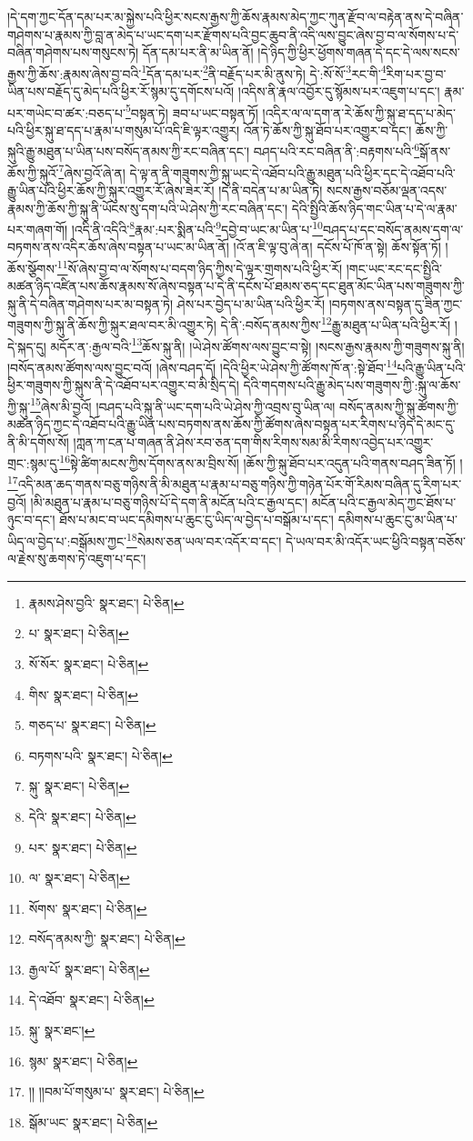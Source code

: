 །དེ་དག་ཀྱང་དོན་དམ་པར་མ་སྐྱེས་པའི་ཕྱིར་སངས་རྒྱས་ཀྱི་ཆོས་རྣམས་མེད་ཀྱང་ཀུན་རྫོབ་ལ་བརྟེན་ནས་དེ་བཞིན་གཤེགས་པ་རྣམས་ཀྱི་བླ་ན་མེད་པ་ཡང་དག་པར་རྫོགས་པའི་བྱང་ཆུབ་ནི་འདི་ལས་བྱུང་ཞེས་བྱ་བ་ལ་སོགས་པ་དེ་བཞིན་གཤེགས་པས་གསུངས་ཏེ། དོན་དམ་པར་ནི་མ་ཡིན་ནོ། །དེ་ཉིད་ཀྱི་ཕྱིར་ཕྱོགས་གཞན་དེ་དང་དེ་ལས་སངས་རྒྱས་ཀྱི་ཆོས་:རྣམས་ཞེས་བྱ་བའི་\footnote{རྣམས་ཤེས་བྱའི་  སྣར་ཐང་།  པེ་ཅིན། }དོན་དམ་པར་\footnote{པ་  སྣར་ཐང་།  པེ་ཅིན། }ནི་བརྗོད་པར་མི་ནུས་ཏེ། དེ་:སོ་སོ་\footnote{སོ་སོར་  སྣར་ཐང་།  པེ་ཅིན། }རང་གི་\footnote{གིས་  སྣར་ཐང་།  པེ་ཅིན། }རིག་པར་བྱ་བ་ཡིན་པས་བརྗོད་དུ་མེད་པའི་ཕྱིར་རོ་སྙམ་དུ་དགོངས་པའོ། །འདིས་ནི་རྣལ་འབྱོར་དུ་སྙོམས་པར་འཇུག་པ་དང་། རྣམ་པར་གཡེང་བ་ཚར་:བཅད་པ་\footnote{གཅད་པ་  སྣར་ཐང་།  པེ་ཅིན། }བསྟན་ཏེ། ཟབ་པ་ཡང་བསྟན་ཏོ། །འདིར་ལ་ལ་དག་ན་རེ་ཆོས་ཀྱི་སྐུ་ཐ་དད་པ་མེད་པའི་ཕྱིར་སྐུ་ཐ་དད་པ་རྣམ་པ་གསུམ་པོ་འདི་ཇི་ལྟར་འགྱུར། འོན་ཏེ་ཆོས་ཀྱི་སྐུ་ཐོབ་པར་འགྱུར་བ་དང་། ཆོས་ཀྱི་སྐུའི་རྒྱུ་མཐུན་པ་ཡིན་པས་བསོད་ནམས་ཀྱི་རང་བཞིན་དང་། བཤད་པའི་རང་བཞིན་ནི་:བརྟགས་པའི་\footnote{བཏགས་པའི་  སྣར་ཐང་།  པེ་ཅིན། }སྒོ་ནས་ཆོས་ཀྱི་སྐུའོ་\footnote{སྐུ་  སྣར་ཐང་།  པེ་ཅིན། }ཞེས་བྱའོ་ཞེ་ན། དེ་ལྟ་ན་ནི་གཟུགས་ཀྱི་སྐུ་ཡང་དེ་འཐོབ་པའི་རྒྱུ་མཐུན་པའི་ཕྱིར་དང་དེ་འཐོབ་པའི་རྒྱུ་ཡིན་པའི་ཕྱིར་ཆོས་ཀྱི་སྐུར་འགྱུར་རོ་ཞེས་ཟེར་རོ། །དེ་ནི་བདེན་པ་མ་ཡིན་ཏེ། སངས་རྒྱས་བཅོམ་ལྡན་འདས་རྣམས་ཀྱི་ཆོས་ཀྱི་སྐུ་ནི་ཡོངས་སུ་དག་པའི་ཡེ་ཤེས་ཀྱི་རང་བཞིན་དང་། དེའི་སྤྱིའི་ཆོས་ཉིད་གང་ཡིན་པ་དེ་ལ་རྣམ་པར་གཞག་གོ། །འདི་ནི་འདིའི་\footnote{དེའི་  སྣར་ཐང་།  པེ་ཅིན། }རྣམ་:པར་སྨིན་པའི་\footnote{པར་  སྣར་ཐང་།  པེ་ཅིན། }དབྱེ་བ་ཡང་མ་ཡིན་པ་\footnote{ལ་  སྣར་ཐང་།  པེ་ཅིན། }བཤད་པ་དང་བསོད་ནམས་དག་ལ་བཏགས་ནས་འདིར་ཆོས་ཞེས་བསྟན་པ་ཡང་མ་ཡིན་ནོ། །འོ་ན་ཇི་ལྟ་བུ་ཞེ་ན། དངོས་པོ་ཁོ་ན་སྟེ། ཆོས་སྟོན་ཏོ། །ཆོས་སྩོགས་\footnote{སོགས་  སྣར་ཐང་།  པེ་ཅིན། }སོ་ཞེས་བྱ་བ་ལ་སོགས་པ་བདག་ཉིད་ཀྱིས་དེ་ལྟར་གྲགས་པའི་ཕྱིར་རོ། །གང་ཡང་རང་དང་སྤྱིའི་མཚན་ཉིད་འཛིན་པས་ཆོས་རྣམས་སོ་ཞེས་བསྟན་པ་དེ་ནི་དངོས་པོ་ཐམས་ཅད་དང་ཐུན་མོང་ཡིན་པས་གཟུགས་ཀྱི་སྐུ་ནི་དེ་བཞིན་གཤེགས་པར་མ་བསྟན་ཏེ། ཤེས་པར་བྱེད་པ་མ་ཡིན་པའི་ཕྱིར་རོ། །བཏགས་ནས་བསྟན་དུ་ཟིན་ཀྱང་གཟུགས་ཀྱི་སྐུ་ནི་ཆོས་ཀྱི་སྐུར་ཐལ་བར་མི་འགྱུར་ཏེ། དེ་ནི་:བསོད་ནམས་ཀྱིས་\footnote{བསོད་ནམས་ཀྱི་  སྣར་ཐང་།  པེ་ཅིན། }རྒྱུ་མཐུན་པ་ཡིན་པའི་ཕྱིར་རོ། །དེ་སྐད་དུ། མདོར་ན་:རྒྱལ་བའི་\footnote{རྒྱལ་པོ་  སྣར་ཐང་།  པེ་ཅིན། }ཆོས་སྐུ་ནི། །ཡེ་ཤེས་ཚོགས་ལས་བྱུང་བ་སྟེ། །སངས་རྒྱས་རྣམས་ཀྱི་གཟུགས་སྐུ་ནི། །བསོད་ནམས་ཚོགས་ལས་བྱུང་བའོ། །ཞེས་བཤད་དོ། །དེའི་ཕྱིར་ཡེ་ཤེས་ཀྱི་ཚོགས་ཁོ་ན་:སྟེ་ཐོབ་\footnote{དེ་འཐོབ་  སྣར་ཐང་།  པེ་ཅིན། }པའི་རྒྱུ་ཡིན་པའི་ཕྱིར་གཟུགས་ཀྱི་སྐུས་ནི་དེ་འཐོབ་པར་འགྱུར་བ་མི་སྲིད་དེ། དེའི་གདགས་པའི་རྒྱུ་མེད་པས་གཟུགས་ཀྱི་:སྐུ་ལ་ཆོས་ཀྱི་སྐུ་\footnote{སྐུ་  སྣར་ཐང་། }ཞེས་མི་བྱའོ། །བཤད་པའི་སྐུ་ནི་ཡང་དག་པའི་ཡེ་ཤེས་ཀྱི་འབྲས་བུ་ཡིན་ལ། བསོད་ནམས་ཀྱི་སྐུ་ཚོགས་ཀྱི་མཚན་ཉིད་ཀྱང་དེ་འཐོབ་པའི་རྒྱུ་ཡིན་པས་བཏགས་ནས་ཆོས་ཀྱི་ཚོགས་ཞེས་བསྟན་པར་རིགས་པ་ཉིད་དེ་མང་དུ་ནི་མི་དགོས་སོ། །ཀླན་ཀ་ངན་པ་གཞན་ནི་ཤེས་རབ་ཅན་དག་གིས་རིགས་སམ་མི་རིགས་འབྱེད་པར་འགྱུར་གྲང་:སྙམ་དུ་\footnote{སྙམ་  སྣར་ཐང་།  པེ་ཅིན། }སྟེ་ཚིག་མངས་ཀྱིས་དོགས་ནས་མ་བྲིས་སོ། །ཆོས་ཀྱི་སྐུ་ཐོབ་པར་འདུན་པའི་གནས་བཤད་ཟིན་ཏོ། །\footnote{།། །།བམ་པོ་གསུམ་པ་  སྣར་ཐང་།  པེ་ཅིན། }འདི་མན་ཆད་གནས་བཅུ་གཉིས་ནི་མི་མཐུན་པ་རྣམ་པ་བཅུ་གཉིས་ཀྱི་གཉེན་པོར་གོ་རིམས་བཞིན་དུ་རིག་པར་བྱའོ། །མི་མཐུན་པ་རྣམ་པ་བཅུ་གཉིས་པོ་དེ་དག་ནི་མངོན་པའི་ང་རྒྱལ་དང་། མངོན་པའི་ང་རྒྱལ་མེད་ཀྱང་ཐོས་པ་ཉུང་བ་དང་། ཐོས་པ་མང་བ་ཡང་དམིགས་པ་ཆུང་ངུ་ཡིད་ལ་བྱེད་པ་བསྒོམ་པ་དང་། དམིགས་པ་ཆུང་ངུ་མ་ཡིན་པ་ཡིད་ལ་བྱེད་པ་:བསྒོམས་ཀྱང་\footnote{སྒོམ་ཡང་  སྣར་ཐང་།  པེ་ཅིན། }སེམས་ཅན་ཡལ་བར་འདོར་བ་དང་། དེ་ཡལ་བར་མི་འདོར་ཡང་ཕྱིའི་བསྟན་བཅོས་ལ་རྗེས་སུ་ཆགས་ཏེ་འཇུག་པ་དང་། 